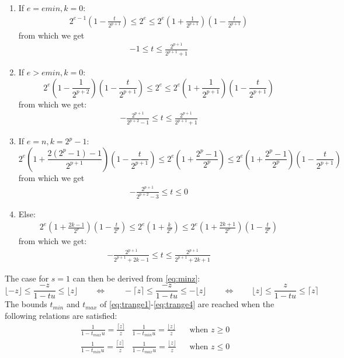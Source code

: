 \documentclass[10pt,a4paper]{article}
\theoremstyle{plain}
\theoremstyle{definition}
\newcommand{\ceil}[1]{\lceil #1 \rceil}
\newcommand{\floor}[1]{\lfloor #1 \rfloor}
\begin{document}
\begin{enumerate}
\item If $e=emin, k=0$:
\begin{align*}
2^{e-1}\left(1-\frac{t}{2^{p+1}}\right)\leq 2^e\leq 2^e\left(1+\frac{1}{2^{p+1}}\right)\left(1-\frac{t}{2^{p+1}}\right)
\end{align*}
from which we get
\begin{align}
-1\leq t\leq\frac{2^{p+1}}{2^{p+1}+1}\label{eq:trange1}
\end{align}
\item If $e>emin, k=0$:
\[
2^e\left(1-\frac{1}{2^{p+2}}\right)\left(1-\frac{t}{2^{p+1}}\right)\leq 2^e\leq 2^e\left(1+\frac{1}{2^{p+1}}\right)\left(1-\frac{t}{2^{p+1}}\right)
\]
from which we get:
\begin{align}
-\frac{2^{p+1}}{2^{p+2}-1}\leq t\leq \frac{2^{p+1}}{2^{p+1}+1}\label{eq:trange2}
\end{align}
\item If $e=n, k=2^p-1$:
\[
2^e\left(1+\frac{2(2^p-1)-1}{2^{p+1}}\right)\left(1-\frac{t}{2^{p+1}}\right)\leq 2^e\left(1+\frac{2^p-1}{2^p}\right) \leq 2^e\left(1+\frac{2^p-1}{2^p}\right)\left(1-\frac{t}{2^{p+1}}\right)
\]
from which we get
\begin{align}
-\frac{2^{p+1}}{2^{p+2}-3}\leq t\leq 0\label{eq:trange3}
\end{align}

\item Else: 
\begin{align*}
2^e\left(1+\frac{2k-1}{2^p}\right)\left(1-\frac{t}{2^p}\right)\leq 2^e\left(1+\frac{k}{2^p}\right)\leq 2^e\left(1+\frac{2k+1}{2^p}\right)\left(1-\frac{t}{2^p}\right)
\end{align*}
from which we get:
\begin{align}
-\frac{2^{p+1}}{2^{p+1}+2k-1}\leq t\leq \frac{2^{p+1}}{2^{p+1}+2k+1}\label{eq:trange4}
\end{align}
\end{enumerate}
The case for $s=1$ can then be derived from \eqref{eq:minz}:
\[
\floor{-z}\leq \frac{-z}{1-tu}\leq \floor{z} \qquad\Leftrightarrow\qquad -\ceil{z}\leq \frac{-z}{1-tu}\leq -\floor{z} \qquad\Leftrightarrow\qquad \floor{z}\leq \frac{z}{1-tu}\leq \ceil{z}
\]
The bounds $t_{min}$ and $t_{max}$ of \eqref{eq:trange1}-\eqref{eq:trange4} are reached when the following relations are satisfied:
\begin{align*}
&\frac{1}{1-t_{max}u}=\frac{\ceil{z}}{z} & \frac{1}{1-t_{min}u}=\frac{\floor{z}}{z} & &\text{when } z\geq 0\\
&\frac{1}{1-t_{min}u}=\frac{\ceil{z}}{z} & \frac{1}{1-t_{max}u}=\frac{\floor{z}}{z} & &\text{when } z\leq 0
\end{align*}
\end{document}
